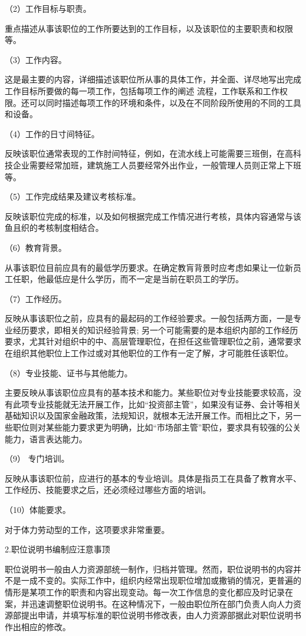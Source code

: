 \documentclass[CJK]{z-article}
\begin{document}
    （2）工作目标与职责。

    重点描述从事该职位的工作所要达到的工作目标，以及该职位的主要职责和权限等。

    （3）工作内容。

    这是最主要的内容，详细描述该职位所从事的具体工作，并全面、详尽地写出完成工作目标所要做的每一项工作，包括每项工作的阐述 流程，工作联系和工作权限。还可以同时描述每项工作的环境和条件，以及在不同阶段所使用的不同的工具和设备。

    （4）工作的日寸间特征。

    反映该职位通常表现的工作肘间特征，例如，在流水线上可能需要三班倒，在高科技企业需要经常加班，建筑施工人员要经常外出作业，一般管理人员则正常上下班等。

    （5）工作完成结果及建议考核标准。

    反映该职位完成的标准，以及如何根据完成工作情况进行考核，具体内容通常与该鱼且织的考核制度相结合。

    （6）教育背景。

    从事该职位目前应具有的最低学历要求。在确定教肓背景时应考虑如果让一位新员工任职，他最低应是什么学历，而不一定是当前在职员工的学历。

    （7）工作经历。

    反映从事该职位之前，应具有的最起码的工作经验要求。一般包括两方面，一是专业经历要求，即相关的知识经验背景; 另一个可能需要的是本组织内部的工作经历要求，尤其针对组织中的中、高层管理职位，在担任这些管理职位之前，通常要求在组织其他职位上工作过或对其他职位的工作有一定了解，才可能胜任该职位。

    （8）专业技能、证书与其他能力。

    主要反映从事该职位应具有的基本技术和能力。某些职位对专业技能要求较高，没有此项专业技能就无法开展工作，比如“投资部主管”，如果没有证券、会计等相关基础知识以及国家金融政策，法规知识，就根本无法开展工作。而相比之下，另一些职位则对某些能力要求更为明确，比如“市场部主管”职位，要求具有较强的公关能力，语言表达能力。

    （9） 专门培训。

    反映从事该职位前，应进行的基本的专业培训。具体是指员工在具备了教育水平、工作经历、技能要求之后，还必须经过哪些方面的培训。

    （10）体能要求。

    对于体力劳动型的工作，这项要求非常重要。

    2.职位说明书编制应汪意事顶

    职位说明书一般由人力资源部统一制作，归档并管理。然而，职位说明书的内容并不是一成不变的。实际工作中，组织内经常出现职位增加或撒销的情况，更普遍的情形是某项工作的职责和内容出现变动。每一次工作信息的变化都应及时记录在案，并迅速调整职位说明书。在这种情况下，一般由职位所在部门负责人向人力资源部提出申请，并填写标准的职位说明书修改表，由人力资源部据此对职位说明书作出相应的修改。
\end{document}
